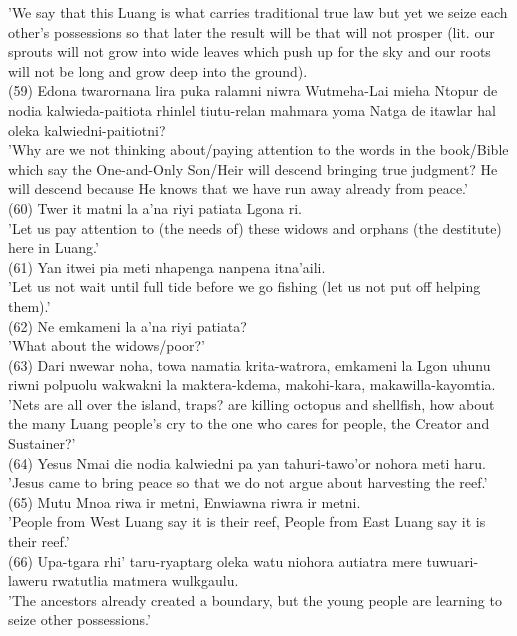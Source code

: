 \documentclass[10pt]{article}
\begin{document}
'We say that this Luang is what carries traditional true law but yet we seize each other's possessions so that later the result will be that will not prosper (lit. our sprouts will not grow into wide leaves which push up for the sky and our roots will not be long and grow deep into the ground).\\
(59) Edona twarornana lira puka ralamni niwra Wutmeha-Lai mieha Ntopur de nodia kalwieda-paitiota rhinlel tiutu-relan mahmara yoma Natga de itawlar hal oleka kalwiedni-paitiotni?\\
'Why are we not thinking about/paying attention to the words in the book/Bible which say the One-and-Only Son/Heir will descend bringing true judgment? He will descend because He knows that we have run away already from peace.'\\
(60) Twer it matni la a'na riyi patiata Lgona ri.\\
'Let us pay attention to (the needs of) these widows and orphans (the destitute) here in Luang.'\\
(61) Yan itwei pia meti nhapenga nanpena itna'aili.\\
'Let us not wait until full tide before we go fishing (let us not put off helping them).'\\
(62) Ne emkameni la a'na riyi patiata?\\
'What about the widows/poor?'\\
(63) Dari nwewar noha, towa namatia krita-watrora, emkameni la Lgon uhunu riwni polpuolu wakwakni la maktera-kdema, makohi-kara, makawilla-kayomtia.\\
'Nets are all over the island, traps? are killing octopus and shellfish, how about the many Luang people's cry to the one who cares for people, the Creator and Sustainer?'\\
(64) Yesus Nmai die nodia kalwiedni pa yan tahuri-tawo'or nohora meti haru.\\
'Jesus came to bring peace so that we do not argue about harvesting the reef.'\\
(65) Mutu Mnoa riwa ir metni, Enwiawna riwra ir metni.\\
'People from West Luang say it is their reef, People from East Luang say it is their reef.'\\
(66) Upa-tgara rhi' taru-ryaptarg oleka watu niohora autiatra mere tuwuari-laweru rwatutlia matmera wulkgaulu.\\
'The ancestors already created a boundary, but the young people are learning to seize other possessions.'\\
\end{document}
